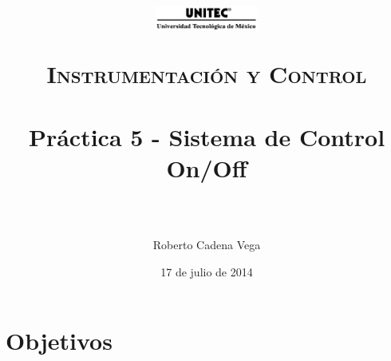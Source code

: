 



\title{
	\normalfont \normalsize
	\begin{figure}[h]
		\begin{center}
			\includegraphics[width=0.3\textwidth]{../images/UNITEC.png} %
		\end{center}
	\end{figure}
	\textsc{Instrumentación y Control} \\ [25pt]
	\horrule{0.5pt} \\[0.4cm] %
	\huge Práctica 5 - Sistema de Control On/Off \\ %
	\horrule{2pt} \\[0.5cm] %
}

\author{Roberto Cadena Vega} %

\date{\normalsize 17 de julio de 2014} %




\maketitle %


\section{Objetivos}

